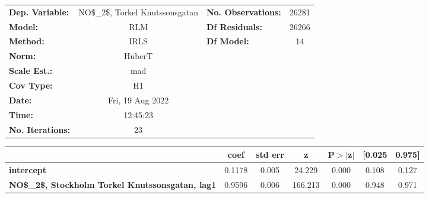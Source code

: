 \begin{landscape}
\begin{table}
\begin{center}
\begin{tabular}{lclc}
\toprule
\textbf{Dep. Variable:}                                     & NO\$\_2\$, Torkel Knutssonsgatan & \textbf{  No. Observations:  } &    26281    \\
\textbf{Model:}                                             &               RLM                & \textbf{  Df Residuals:      } &    26266    \\
\textbf{Method:}                                            &               IRLS               & \textbf{  Df Model:          } &       14    \\
\textbf{Norm:}                                              &              HuberT              & \textbf{                     } &             \\
\textbf{Scale Est.:}                                        &               mad                & \textbf{                     } &             \\
\textbf{Cov Type:}                                          &                H1                & \textbf{                     } &             \\
\textbf{Date:}                                              &         Fri, 19 Aug 2022         & \textbf{                     } &             \\
\textbf{Time:}                                              &             12:45:23             & \textbf{                     } &             \\
\textbf{No. Iterations:}                                    &                23                & \textbf{                     } &             \\
\bottomrule
\end{tabular}
\begin{tabular}{lcccccc}
                                                            & \textbf{coef} & \textbf{std err} & \textbf{z} & \textbf{P$> |$z$|$} & \textbf{[0.025} & \textbf{0.975]}  \\
\midrule
\textbf{intercept}                                          &       0.1178  &        0.005     &    24.229  &         0.000        &        0.108    &        0.127     \\
\textbf{NO\$\_2\$, Stockholm Torkel Knutssonsgatan, lag1}   &       0.9596  &        0.006     &   166.213  &         0.000        &        0.948    &        0.971     \\

\end{tabular}
\end{center}
\end{table}
\end{landscape}
